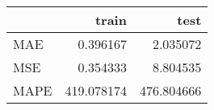 \begin{tabular}{lrr}
\toprule
{} &       train &        test \\
\midrule
MAE  &    0.396167 &    2.035072 \\
MSE  &    0.354333 &    8.804535 \\
MAPE &  419.078174 &  476.804666 \\
\bottomrule
\end{tabular}
